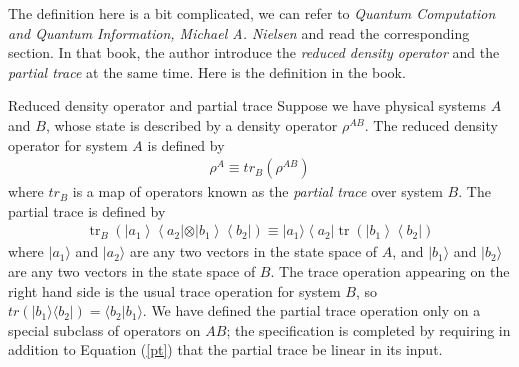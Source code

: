\documentclass[UTF8,12pt]{article} %
\numberwithin{equation}{section}
\begin{document}
The definition here is a bit complicated, we can refer to \textit{Quantum Computation and Quantum Information, Michael A. Nielsen} and read the corresponding section. In that book, the author introduce the \textit{reduced density operator} and the \textit{partial trace} at the same time. Here is the definition in the book.\\

\begin{definition}{Reduced density operator and partial trace}{}
Suppose we have physical systems $A$ and $B$, whose state is described by a density operator $\rho^{AB}$. The reduced density operator for system $A$ is defined by
\begin{align}
\rho^{A} \equiv tr_{B}(\rho^{AB})
\end{align}
where $tr_{B}$ is a map of operators known as the \textit{partial trace} over system $B$. The partial trace is defined by
\begin{align}\label{pt}
\operatorname{tr}_{B}\left( | a_{1}\right\rangle\left\langle a_{2}|\otimes| b_{1}\right\rangle\left\langle b_{2} |\right) \equiv | a_{1} \rangle\left\langle a_{2} | \operatorname{tr}\left( | b_{1}\right\rangle\left\langle b_{2} |\right)\right.
\end{align}
where $|a_{1}\rangle$ and $|a_{2}\rangle$ are any two vectors in the state space of $A$, and $|b_{1}\rangle$ and $|b_{2}\rangle$ are any two vectors in the state space of $B$. The trace operation appearing on the right hand side is the usual trace operation for system $B$, so $tr(|b_{1}\rangle\langle b_{2}|) = \langle b_{2}|b_{1}\rangle$. We have defined the partial trace operation only on a special subclass of operators on $AB$; the specification is completed by requiring in addition to Equation (\ref{pt}) that the partial trace be linear in its input.
\end{definition}
\end{document}
